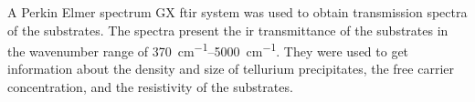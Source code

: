 A Perkin Elmer spectrum GX \ac{ftir} system was used to obtain transmission spectra of the substrates. The spectra present the \ac{ir} transmittance of the substrates in the wavenumber range of \SIrange{370}{5000}{\centi\metre^{-1}}. They were used to get information about the density and size of tellurium precipitates, the free carrier concentration, and the resistivity of the substrates. %

